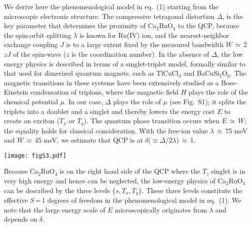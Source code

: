 \documentclass[twocolumn,prb,aps,showpacs]{revtex4-1}
\newcommand{\CRO}{{Ca$_2$RuO$_4$} }
\newcommand{\CROns}{Ca$_2$RuO$_4$}
\begin{document}
We derive here the phenomenological model in eq.~(1) starting from the microscopic electronic structure. The compressive tetragonal distortion $\Delta$, is the key parameter that determines the proximity of \CRO to the QCP, because the spin-orbit splitting $\lambda$ is known for Ru(IV) ion, and the nearest-neighbor exchange coupling $J$ is to a large extent fixed by the measured bandwidth $W$\,$\simeq$\,2$zJ$ of the spin-wave ($z$ is the coordination number). In the absence of $\Delta$, the low energy physics is described in terms of a singlet-triplet model\cite{Khaliullin_2013}, formally similar to that used for dimerized quantum magnets\cite{Ruegg_2008_2}, such as  TlCuCl$_3$ and BaCuSi$_2$O$_6$. The magnetic transitions in these systems have been extensively studied as a Bose-Einstein condensation of triplons, where the magnetic field $H$ plays the role of the chemical potential $\mu$. In our case, $\Delta$ plays the role of $\mu$ (see Fig.~S1); it splits the triplets into a doublet and a singlet and thereby lowers the energy cost $E$ to create an exciton ($T_x$ or $T_y$). The quantum phase transition occurs when $E$\,$\simeq$\,$W$; the equality holds for classical consideration. With the free-ion value $\lambda$\,$\approx$\,75 meV and $W$\,$\approx$\,45 meV, we estimate that QCP is at $\delta$($\equiv$$\Delta$/$2 \lambda$)\,$\approx$\,1. 

\begin{figure*}
\texttt{[image: figS3.pdf]}
\renewcommand{\thefigure}{S\arabic{figure}}
\caption{{\bf Time-of-flight INS spectra of \CROns.}  {\bf a-h,} Constant energy maps of INS intensity in the ($H$,$K$) plane with $L$ integrated. The wave-vectors are expressed in reciprocal lattice units (r.l.u.) of a tetragonal cell with  $a^{*}$=\,$b^{*}$=\,1.16\,\AA$^{-1}$ and $c^{*}$=\,0.53\,\AA$^{-1}$. At $E$\,=\,14\,meV, intense spin waves are observed at the reduced wave-vectors $(\pm 1,0)$ and $(0,\pm 1)$, which correspond to the antiferromagnetic ordering wave-vector $(\pi,\pi)$ for the 2D square lattice Brillouin-zone.  {\bf i-l,} Energy spectra along high-symmetry directions as shown in blue lines in panel {\bf a}. The intensity is in arbitrary units. }
\end{figure*}

Because \CRO is on the right hand side of the QCP where the $T_z$ singlet is in very high energy and hence can be neglected, the low-energy physics of \CRO can be described by the three levels $\{s,T_x,T_y\}$. These three levels constitute the effective $S$\,=\,1 degrees of freedom in the phenomenological model in eq.~(1). We note that the large energy scale of $E$ microscopically originates from $\lambda$ and depends on $\delta$.  
\end{document}
